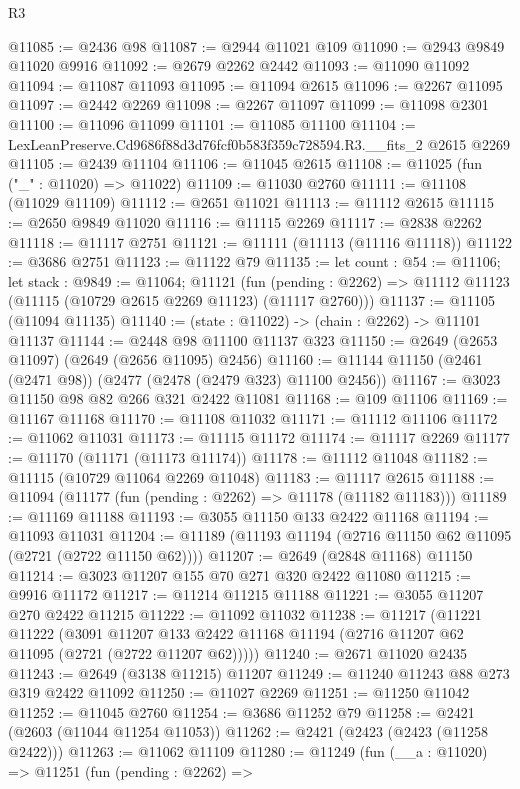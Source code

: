 \begin{lexlean}{R3}
\begin{coremodule}
@11085 := @2436 @98
@11087 := @2944 @11021 @109
@11090 := @2943 @9849 @11020 @9916
@11092 := @2679 @2262 @2442
@11093 := @11090 @11092
@11094 := @11087 @11093
@11095 := @11094 @2615
@11096 := @2267 @11095
@11097 := @2442 @2269
@11098 := @2267 @11097
@11099 := @11098 @2301
@11100 := @11096 @11099
@11101 := @11085 @11100
@11104 := LexLeanPreserve.Cd9686f88d3d76fcf0b583f359c728594.R3.__fits_2 @2615 @2269
@11105 := @2439 @11104
@11106 := @11045 @2615
@11108 := @11025 (fun ("_" : @11020) => @11022)
@11109 := @11030 @2760
@11111 := @11108 (@11029 @11109)
@11112 := @2651 @11021
@11113 := @11112 @2615
@11115 := @2650 @9849 @11020
@11116 := @11115 @2269
@11117 := @2838 @2262
@11118 := @11117 @2751
@11121 := @11111 (@11113 (@11116 @11118))
@11122 := @3686 @2751
@11123 := @11122 @79
@11135 := let count : @54 := @11106;
  let stack : @9849 := @11064;
  @11121
    (fun (pending : @2262) => @11112 @11123 (@11115 (@10729 @2615 @2269 @11123) (@11117 @2760)))
@11137 := @11105 (@11094 @11135)
@11140 := (state : @11022) -> (chain : @2262) -> @11101 @11137
@11144 := @2448 @98 @11100 @11137 @323
@11150 := @2649 (@2653 @11097) (@2649 (@2656 @11095) @2456)
@11160 := @11144 @11150 (@2461 (@2471 @98)) (@2477 (@2478 (@2479 @323) @11100 @2456))
@11167 := @3023 @11150 @98 @82 @266 @321 @2422 @11081
@11168 := @109 @11106
@11169 := @11167 @11168
@11170 := @11108 @11032
@11171 := @11112 @11106
@11172 := @11062 @11031
@11173 := @11115 @11172
@11174 := @11117 @2269
@11177 := @11170 (@11171 (@11173 @11174))
@11178 := @11112 @11048
@11182 := @11115 (@10729 @11064 @2269 @11048)
@11183 := @11117 @2615
@11188 := @11094 (@11177 (fun (pending : @2262) => @11178 (@11182 @11183)))
@11189 := @11169 @11188
@11193 := @3055 @11150 @133 @2422 @11168
@11194 := @11093 @11031
@11204 := @11189 (@11193 @11194 (@2716 @11150 @62 @11095 (@2721 (@2722 @11150 @62))))
@11207 := @2649 (@2848 @11168) @11150
@11214 := @3023 @11207 @155 @70 @271 @320 @2422 @11080
@11215 := @9916 @11172
@11217 := @11214 @11215 @11188
@11221 := @3055 @11207 @270 @2422 @11215
@11222 := @11092 @11032
@11238 := @11217
    (@11221
      @11222
      (@3091 @11207 @133 @2422 @11168 @11194 (@2716 @11207 @62 @11095 (@2721 (@2722 @11207 @62)))))
@11240 := @2671 @11020 @2435
@11243 := @2649 (@3138 @11215) @11207
@11249 := @11240 @11243 @88 @273 @319 @2422 @11092
@11250 := @11027 @2269
@11251 := @11250 @11042
@11252 := @11045 @2760
@11254 := @3686 @11252 @79
@11258 := @2421 (@2603 (@11044 @11254 @11053))
@11262 := @2421 (@2423 (@2423 (@11258 @2422)))
@11263 := @11062 @11109
@11280 := @11249
    (fun (__a : @11020) =>
    @11251
      (fun (pending : @2262) =>

\end{coremodule}
\end{lexlean}
